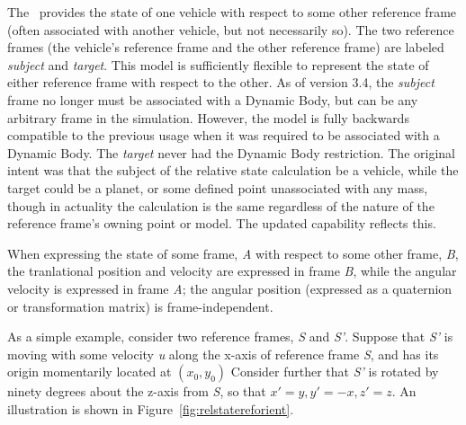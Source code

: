 %
%
% 
%



The \RelativeDesc\ provides the state of one vehicle with respect to some other reference frame (often associated with another vehicle, but not necessarily so).  The two reference frames (the vehicle's reference frame and the other reference frame) are labeled \textit{subject} and \textit{target}.  This model is sufficiently flexible to represent the state of either reference frame with respect to the other.  As of version 3.4, the \textit{subject} frame no longer must be associated with a Dynamic Body, but can be any arbitrary frame in the simulation.  However, the model is fully backwards compatible to the previous usage when it was required to be associated with a Dynamic Body. The \textit{target} never had the Dynamic Body restriction. The original intent was that the subject of the relative state calculation be a vehicle, while the target could be a planet, or some defined point unassociated with any mass, though in actuality the calculation is the same regardless of the nature of the reference frame's owning point or model. The updated capability reflects this.

When expressing the state of some frame, \textit{A} with respect to some other frame, \textit{B}, the tranlational position and velocity are expressed in frame \textit{B}, while the angular velocity is expressed in frame \textit{A}; the angular position (expressed as a quaternion or transformation matrix) is frame-independent.

As a simple example, consider two reference frames, \textit{S} and \textit{S'}.  Suppose that \textit{S'} is moving with some velocity \textit{u} along the x-axis of reference frame \textit{S}, and has its origin momentarily located at $(x_0,y_0)$  Consider further that \textit{S'} is rotated by ninety degrees about the z-axis from \textit{S}, so that $x' = y,  y' = -x, z' = z$.  An illustration is shown in Figure~\ref{fig:relstatereforient}.

